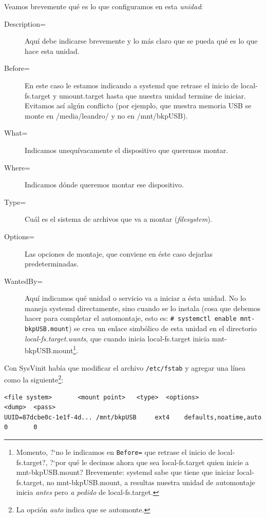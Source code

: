 \documentclass[10pt,a4paper]{article}
\begin{document}
Veamos brevemente qu\'e es lo que configuramos en esta \emph{unidad}:

\begin{description}
    \item [Description=] Aqu\'i debe indicarse brevemente y lo m\'as claro que se pueda qu\'e es lo que hace esta unidad.
    \item [Before=] En este caso le estamos indicando a systemd que retrase el inicio de local-fs.target y umount.target hasta que nuestra unidad termine de iniciar. Evitamos as\'i alg\'un conflicto (por ejemplo, que nuestra memoria USB se monte en /media/leandro/ y no en /mnt/bkpUSB).\\
    \item [What=] Indicamos unequ\'ivacamente el dispositivo que queremos montar.
    \item [Where=] Indicamos d\'onde queremos montar ese dispositivo.
    \item [Type=] Cu\'al es el sistema de archivos que va a montar (\emph{filesystem}).
    \item [Options=] Las opciones de montaje, que conviene en \'este caso dejarlas predeterminadas.
    \item [WantedBy=] Aqu\'i indicamos qu\'e unidad o servicio va a iniciar a \'esta unidad. No lo maneja systemd directamente, sino cuando se lo instala (cosa que debemos hacer para completar el automontaje, esto es: \lstinline{# systemctl enable mnt-bkpUSB.mount}) se crea un enlace simb\'olico de esta unidad en el directorio \emph{local-fs.target.wants}, que cuando inicia local-fs.target inicia mnt-bkpUSB.mount\footnote{Momento, ?`no le indicamos en \texttt{Before=} que retrase el inicio de local-fs.target?, ?`por qu\'e le decimos ahora que sea local-fs.target quien inicie a mnt-bkpUSB.mount? Brevemente: systemd sabe que tiene que iniciar local-fs.target, no mnt-bkpUSB.mount, a resultas nuestra unidad de automontaje inicia \emph{antes} pero \emph{a pedido} de local-fs.target.}.
\end{description}

Con SysVinit hab\'ia que modificar el archivo \texttt{/etc/fstab} y agregar una l\'inea como la siguiente\footnote{La opci\'on \emph{auto} indica que se automonte.}:
\begin{scriptsize}
\begin{mdframed}
\begin{verbatim}
<file system>       <mount point>   <type>  <options>               <dump>  <pass>
UUID=87dcbe0c-1e1f-4d... /mnt/bkpUSB     ext4    defaults,noatime,auto   0       0
\end{verbatim}
\end{mdframed}
\end{scriptsize}
\end{document}
